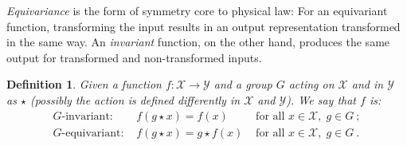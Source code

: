 \documentclass{article}
\theoremstyle{Hogg}
\newtheorem{definition}{Definition}
\begin{document}
\emph{Equivariance} is the form of symmetry core to physical law: For an equivariant function, transforming the input results in an output representation transformed in the same way.
An \emph{invariant} function, on the other hand, produces the same output for transformed and non-transformed inputs.
\begin{definition} Given a function $f:\mathcal X \to \mathcal Y$ and a group $G$ acting on $\mathcal X$ and in $\mathcal Y$ as $\star$ (possibly the action is defined differently in $\mathcal X$ and $\mathcal Y$). We say that $f$ is:
\begin{eqnarray}
    G\text{-invariant: } & f(g\star   x) = f(  x) & \text { for all }   x \in \mathcal X, \; g\in G ~;\\ 
    G\text{-equivariant: } & f(g \star   x) = g\star f(  x) & \text { for all }   x \in \mathcal X, \; g\in G ~.
\end{eqnarray}
\end{definition}
\end{document}
